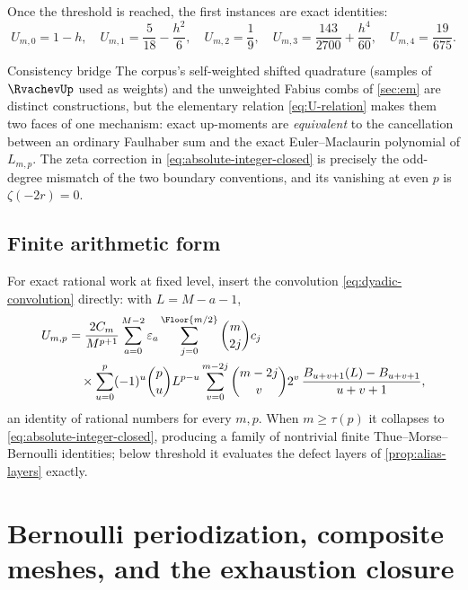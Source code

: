 Once the threshold is reached, the first instances are exact
identities:
\begin{equation}
 U_{m,0}=1-h,\quad
 U_{m,1}=\frac5{18}-\frac{h^{2}}{6},\quad
 U_{m,2}=\frac19,\quad
 U_{m,3}=\frac{143}{2700}+\frac{h^{4}}{60},\quad
 U_{m,4}=\frac{19}{675}.
 \label{eq:U-low}
\end{equation}

\begin{statusbox}{Consistency bridge}
The corpus's self-weighted shifted quadrature (samples of $\RvachevUp$ used as
weights) and the unweighted Fabius combs of \cref{sec:em} are distinct
constructions, but the elementary relation
\eqref{eq:U-relation} makes them two faces of one mechanism: exact
up-moments are \emph{equivalent} to the cancellation between an
ordinary Faulhaber sum and the exact Euler--Maclaurin polynomial of
$L_{m,p}$.  The zeta correction in
\eqref{eq:absolute-integer-closed} is precisely the odd-degree
mismatch of the two boundary conventions, and its vanishing at even
$p$ is $\zeta(-2r)=0$.
\end{statusbox}

\subsection{Finite arithmetic form}

For exact rational work at fixed level, insert the convolution
\eqref{eq:dyadic-convolution} directly: with $L=M-a-1$,
\begin{equation}
 \begin{aligned}
 U_{m,p}
 &=\frac{2C_m}{M^{p+1}}
   \sum_{a=0}^{M-2}\eps_a
   \sum_{j=0}^{\Floor{m/2}}\binom m{2j}c_j\\
 &\quad\times\sum_{u=0}^{p}(-1)^{u}\binom pu L^{p-u}
   \sum_{v=0}^{m-2j}\binom{m-2j}{v}2^{v}\,
   \frac{B_{u+v+1}(L)-B_{u+v+1}}{u+v+1},
 \end{aligned}
 \label{eq:absolute-Bernoulli}
\end{equation}
an identity of rational numbers for every $m,p$.  When
$m\ge\tau(p)$ it collapses to \eqref{eq:absolute-integer-closed},
producing a family of nontrivial finite Thue--Morse--Bernoulli
identities; below threshold it evaluates the defect layers of
\cref{prop:alias-layers} exactly.

\section{Bernoulli periodization, composite meshes, and the exhaustion
closure}
\label{sec:periodized}

